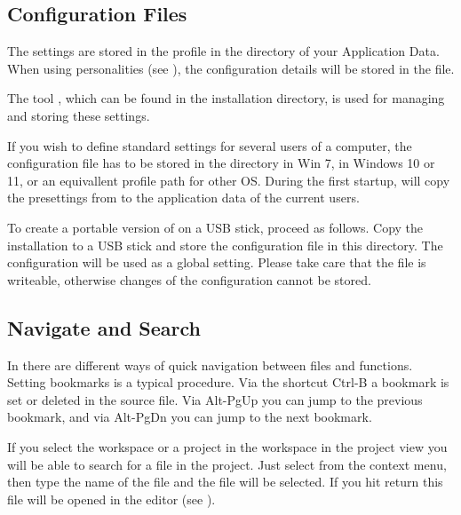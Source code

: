 \subsection{Configuration Files}

The \codeblocks settings are stored in the  profile in the  directory of your Application Data. When using personalities (see ), the configuration details will be stored in the  file.

The tool , which can be found in the \codeblocks installation directory, is used for managing and storing these settings.

If you wish to define standard settings for several users of a computer, the configuration file  has to be stored in the directory  in Win 7,  in Windows 10 or 11, or an equivallent profile path for other OS. During the first startup, \codeblocks will copy the presettings from  to the application data of the current users.

To create a portable version of \codeblocks on a USB stick, proceed as follows. Copy the \codeblocks installation to a USB stick and store the configuration file  in this directory. The configuration will be used as a global setting. Please take care that the file is writeable, otherwise changes of the configuration cannot be stored.

\subsection{Navigate and Search}

In \codeblocks there are different ways of quick navigation between files and functions. Setting bookmarks is a typical procedure. Via the shortcut Ctrl-B a bookmark is set or deleted in the source file. Via Alt-PgUp you can jump to the previous bookmark, and via Alt-PgDn you can jump to the next bookmark.

If you select the workspace or a project in the workspace in the project view you will be able to search for a file in the project. Just select  from the context menu, then type the name of the file and the file will be selected. If you hit return this file will be opened in the editor (see ).

